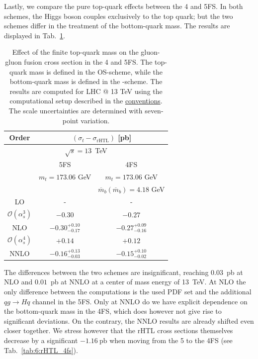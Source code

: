 Lastly, we compare the pure top-quark effects between the 4 and 5\acs{FS}. In both schemes, the Higgs boson couples exclusively to the top quark; but the two schemes differ in the treatment of the bottom-quark mass. The results are displayed in Tab.~\ref{tab:6:t-rHTL_4vs5FS}.
\begin{table}[t]
\centering
\begin{tabular}{ccc}
  \hline
  Order & \multicolumn{2}{c}{$(\sigma_{t} - \sigma_\text{rHTL})$ [pb]} \\
  \hline
  \hline
  \multicolumn{3}{c}{$\sqrt{s}=13$~TeV} \\
  \hline
  & 5FS & 4FS \\
  & $m_t = 173.06$ GeV &  $m_t = 173.06$ GeV \\
  & & $\overline{m}_b(\overline{m}_b)=4.18$ GeV\\
  \hline
  LO & - & - \\
  \hline
  $\mathcal{O}(\alpha_s^3)$ & $-0.30$  &  $-0.27$ \\
  NLO & $-0.30^{+0.10}_{-0.17}$ & $-0.27^{+0.09}_{-0.16}$ \\
  \hline
  $\mathcal{O}(\alpha_s^4)$ & $+0.14$ & $+0.12$ \\
  NNLO & $-0.16^{+0.13}_{-0.03}$ & $-0.15^{+0.10}_{-0.02}$\\
  \hline
  \end{tabular}
\caption{Effect of the finite top-quark mass on the gluon-gluon fusion cross section in the 4 and 5\acs{FS}. The top-quark mass is defined in the \acs{OS}-scheme, while the bottom-quark mass is defined in the \MS-scheme. The results are computed for LHC @ 13 TeV using the computational setup described in the \hyperref[chap:notation_and_conventions]{conventions}. The scale uncertainties are determined with seven-point variation.}
\label{tab:6:t-rHTL_4vs5FS}
\end{table}
The differences between the two schemes are insignificant, reaching $0.03$~pb at \acs{NLO} and $0.01$~pb at \acs{NNLO} at a center of mass energy of 13~TeV. At \acs{NLO} the only difference between the computations is the used \acs{PDF} set and the additional $qg \longrightarrow Hq$ channel in the 5\acs{FS}. Only at \acs{NNLO} do we have explicit dependence on the bottom-quark mass in the 4\acs{FS}, which does however not give rise to significant deviations. On the contrary, the \acs{NNLO} results are already shifted even closer together. We stress however that the \acs{rHTL} cross sections themselves decrease by a significant $-1.16\ \mathrm{pb}$ when moving from the 5 to the 4\acs{FS} (see Tab.~\ref{tab:6:rHTL_4fs}).

